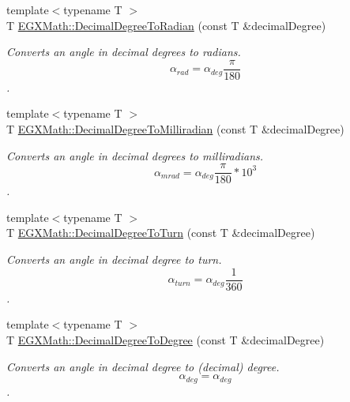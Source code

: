 \begin{DoxyCompactItemize}
\item 
{\footnotesize template$<$typename T $>$ }\\T \mbox{\hyperlink{group___e_g_x_math-_conversions-_angle_conversions-_decimal_degree_ga906ee2c83cdf4caa59eb613dc2d5d52a}{E\+G\+X\+Math\+::\+Decimal\+Degree\+To\+Radian}} (const T \&decimal\+Degree)
\begin{DoxyCompactList}\small\item\em Converts an angle in decimal degrees to radians. \[\alpha_{rad}=\alpha_{deg}\frac{\pi}{180}\]. \end{DoxyCompactList}\item 
{\footnotesize template$<$typename T $>$ }\\T \mbox{\hyperlink{group___e_g_x_math-_conversions-_angle_conversions-_decimal_degree_gab567d02d4692d9642a4ad219e479713a}{E\+G\+X\+Math\+::\+Decimal\+Degree\+To\+Milliradian}} (const T \&decimal\+Degree)
\begin{DoxyCompactList}\small\item\em Converts an angle in decimal degrees to milliradians. \[\alpha_{mrad}=\alpha_{deg}\frac{\pi}{180}*10^3\]. \end{DoxyCompactList}\item 
{\footnotesize template$<$typename T $>$ }\\T \mbox{\hyperlink{group___e_g_x_math-_conversions-_angle_conversions-_decimal_degree_ga396a13c10acdef5026c12f3217b142c1}{E\+G\+X\+Math\+::\+Decimal\+Degree\+To\+Turn}} (const T \&decimal\+Degree)
\begin{DoxyCompactList}\small\item\em Converts an angle in decimal degree to turn. \[\alpha_{turn}=\alpha_{deg}\frac{1}{360}\]. \end{DoxyCompactList}\item 
{\footnotesize template$<$typename T $>$ }\\T \mbox{\hyperlink{group___e_g_x_math-_conversions-_angle_conversions-_decimal_degree_ga0aa7f2f5dbb00cf4ab303421c6e33ccf}{E\+G\+X\+Math\+::\+Decimal\+Degree\+To\+Degree}} (const T \&decimal\+Degree)
\begin{DoxyCompactList}\small\item\em Converts an angle in decimal degree to (decimal) degree. \[\alpha_{deg}=\alpha_{deg}\]. \end{DoxyCompactList}\item 
\mbox{\label{_decimal_degree_conversion_8inl_afccf9cd779903872887978ab9d79661f}} 

\end{DoxyCompactItemize}
